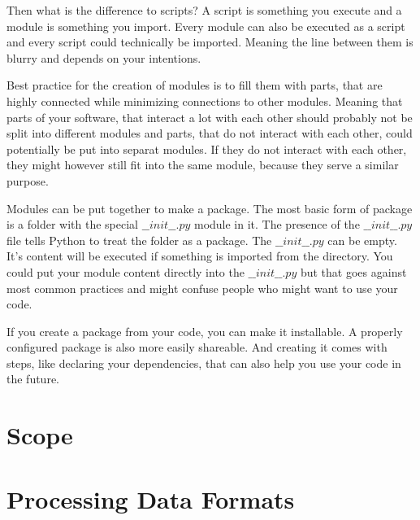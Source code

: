 \documentclass{article}
\begin{document}
Then what is the difference to scripts?
A script is something you execute and a module is something you import.
Every module can also be executed as a script and every script could
technically be imported.
Meaning the line between them is blurry and depends on your intentions.

Best practice for the creation of modules is to fill them with parts, that are
highly connected while minimizing connections to other modules.
Meaning that parts of your software, that interact a lot with each other
should probably not be split into different modules and parts, that do not interact with
each other, could potentially be put into separat modules.
If they do not interact with each other, they might however still fit into
the same module, because they serve a similar purpose.

Modules can be put together to make a package.
The most basic form of package is a folder with the special $\_\_init\_\_.py$
module in it.
The presence of the $\_\_init\_\_.py$ file tells Python to treat the folder as a
package.
The $\_\_init\_\_.py$ can be empty.
It's content will be executed if something is imported from the directory.
You could put your module content directly into the $\_\_init\_\_.py$ but
that goes against most common practices and might confuse people
who might want to use your code.

If you create a package from your code, you can make it installable.
A properly configured package is also more easily shareable.
And creating it comes with steps, like declaring your dependencies, that
can also help you use your code in the future.


\section{Scope}
\section{Processing Data Formats}


\printbibliography[type=book,title={Book Sources}]
\end{document}
